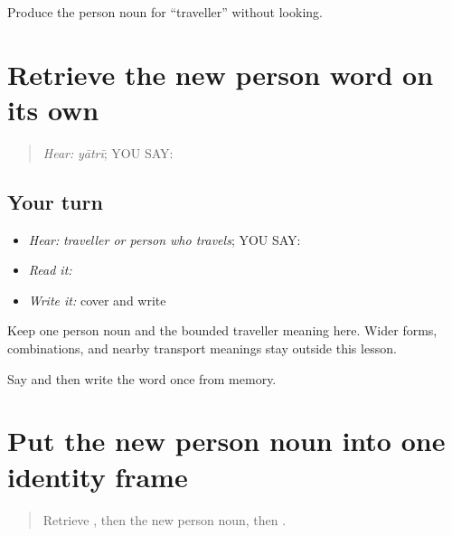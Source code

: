 \begin{tcolorbox}[breakable,colback=teal!4,colframe=teal!35!black,title={Before you move on}]
Produce the person noun for “traveller” without looking.
\end{tcolorbox}
\section[\texorpdfstring{\pa{ਯਾਤਰੀ} (yaatrii)}{ਯਾਤਰੀ (yaatrii)}]{Retrieve the new person word on its own}

\label{lesson:PA-C202-yatri-review}



\begin{quote}
\emph{Hear:} \emph{yātrī}; YOU SAY: \textbf{}
\end{quote}

\subsection*{Your turn}
\begin{itemize}
\raggedright
  \item \emph{Hear:} \emph{traveller or person who travels}; YOU SAY: \textbf{}
  \item \emph{Read it:} \textbf{}
  \item \emph{Write it:} cover and write \textbf{}
\end{itemize}

\begin{grammarlens}[title={Grammar Lens}]
Keep one person noun and the bounded traveller meaning here. Wider forms, combinations, and nearby transport meanings stay outside this lesson.
\end{grammarlens}

\begin{tcolorbox}[breakable,colback=teal!4,colframe=teal!35!black,title={Before you move on}]
Say and then write the word once from memory.
\end{tcolorbox}
\section[\texorpdfstring{\pa{ਇਹ} \pa{ਯਾਤਰੀ} \pa{ਹੈ} (eh yaatrii hai)}{ਇਹ ਯਾਤਰੀ ਹੈ (eh yaatrii hai)}]{Put the new person noun into one identity frame}

\label{lesson:PA-C202-traveller-label}



\begin{quote}
Retrieve \textbf{}, then the new person noun, then \textbf{}.
\end{quote}

